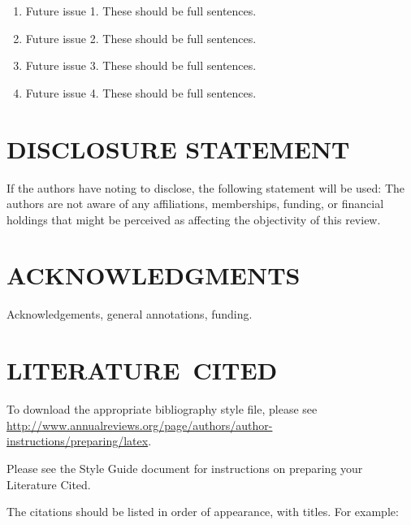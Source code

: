 \documentclass{ar-1col}
\begin{document}
\begin{issues}
\begin{enumerate}
\item Future issue 1. These should be full sentences.
\item Future issue 2. These should be full sentences.
\item Future issue 3. These should be full sentences.
\item Future issue 4. These should be full sentences.
\end{enumerate}
\end{issues}

\section*{DISCLOSURE STATEMENT}
If the authors have noting to disclose, the following statement will be used: The authors are not aware of any affiliations, memberships, funding, or financial holdings that
might be perceived as affecting the objectivity of this review. 

\section*{ACKNOWLEDGMENTS}
Acknowledgements, general annotations, funding.

%
\section*{LITERATURE\ CITED}

To download the appropriate bibliography style file, please see \url{http://www.annualreviews.org/page/authors/author-instructions/preparing/latex}. 

\noindent
Please see the Style Guide document for instructions on preparing your Literature Cited.

The citations should be listed in order of appearance, with titles. For example:
\end{document}
